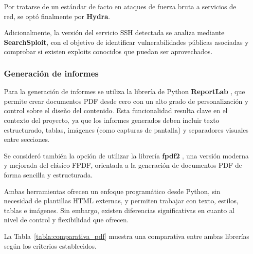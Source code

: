 \begin{parskipenv}
Por tratarse de un estándar de facto en ataques de fuerza bruta a servicios de red, se optó finalmente por \textbf{Hydra}.

Adicionalmente, la versión del servicio SSH detectada se analiza mediante \textbf{SearchSploit}, con el objetivo de identificar vulnerabilidades públicas asociadas y comprobar si existen exploits conocidos que puedan ser aprovechados.

\subsubsection*{Generación de informes}
Para la generación de informes se utiliza la librería de Python \textbf{ReportLab} \cite{reportlab}, que permite crear documentos PDF desde cero con un alto grado de personalización y control sobre el diseño del contenido. Esta funcionalidad resulta clave en el contexto del proyecto, ya que los informes generados deben incluir texto estructurado, tablas, imágenes (como capturas de pantalla) y separadores visuales entre secciones.

Se consideró también la opción de utilizar la librería \textbf{fpdf2} \cite{fpdf2}, una versión moderna y mejorada del clásico FPDF, orientada a la generación de documentos PDF de forma sencilla y estructurada.

Ambas herramientas ofrecen un enfoque programático desde Python, sin necesidad de plantillas HTML externas, y permiten trabajar con texto, estilos, tablas e imágenes. Sin embargo, existen diferencias significativas en cuanto al nivel de control y flexibilidad que ofrecen.

La Tabla~\ref{tabla:comparativa_pdf} muestra una comparativa entre ambas librerías según los criterios establecidos.

\begin{table}[H]
\centering
\renewcommand{\arraystretch}{1.4}
\caption{Comparativa de herramientas para generación de informes PDF.}
\label{tabla:comparativa_pdf}
\end{table}


\end{parskipenv}
